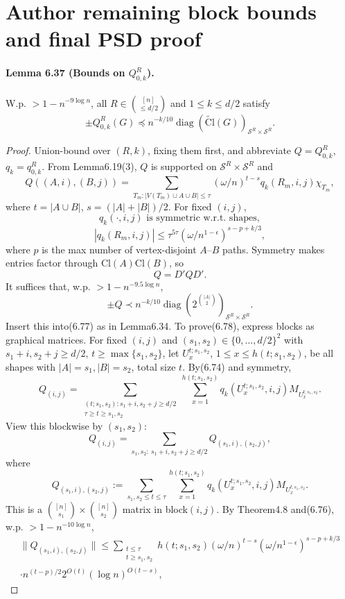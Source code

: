\section*{Author remaining block bounds and final PSD proof}
\paragraph{Lemma 6.37 (Bounds on $Q_{0,k}^R$).} W.p. $>1-n^{-9\log n}$, all $R\in\binom{[n]}{\le d/2}$ and $1\le k\le d/2$ satisfy
\[\pm Q_{0,k}^R(G)\preceq n^{-k/10}\operatorname{diag}(\widetilde{\mathrm{Cl}}(G))_{\mathcal S^R\times\mathcal S^R}.\]
\begin{proof}Union-bound over $(R,k)$, fixing them first, and abbreviate $Q=Q_{0,k}^R$, $q_k=q_{0,k}^R$. From Lemma6.19(3), $Q$ is supported on $\mathcal S^R\times\mathcal S^R$ and
\[Q((A,i),(B,j))=\sum_{T_m:|V(T_m)\cup A\cup B|\le\tau}(\omega/n)^{t-s}q_k(R_m,i,j)\chi_{T_m},\tag{6.74}\]
where $t=|A\cup B|$, $s=(|A|+|B|)/2$. For fixed $(i,j)$,
\[q_k(\cdot,i,j)\text{ is symmetric w.r.t. shapes},\tag{6.75}\]
\[|q_k(R_m,i,j)|\le\tau^{5\tau}(\omega/n^{1-\epsilon})^{s-p+k/3},\tag{6.76}\]
where $p$ is the max number of vertex-disjoint $A$--$B$ paths. Symmetry makes entries factor through $\mathrm{Cl}(A)\mathrm{Cl}(B)$, so
\[Q=D'QD'.\tag{6.77}\]
It suffices that, w.p. $>1-n^{-9.5\log n}$,
\[\pm Q\prec n^{-k/10}\operatorname{diag}(2^{\binom{|A|}2})_{\mathcal S^R\times\mathcal S^R}.\tag{6.78}\]
Insert this into(6.77) as in Lemma6.34. To prove(6.78), express blocks as graphical matrices. For fixed $(i,j)$ and $(s_1,s_2)\in\{0,\ldots,d/2\}^2$ with $s_1+i,s_2+j\ge d/2$, $t\ge\max\{s_1,s_2\}$, let $U_x^{t;s_1,s_2}$, $1\le x\le h(t;s_1,s_2)$, be all shapes with $|A|=s_1,|B|=s_2$, total size $t$. By(6.74) and symmetry,
\[Q_{(i,j)}=\sum_{\substack{(t;s_1,s_2)\colon s_1+i,s_2+j\ge d/2\\\tau\ge t\ge s_1,s_2}}\sum_{x=1}^{h(t;s_1,s_2)}q_k(U_x^{t;s_1,s_2},i,j)M_{U_x^{t;s_1,s_2}}.\]
View this blockwise by $(s_1,s_2)$:
\[Q_{(i,j)}=\sum_{s_1,s_2:\ s_1+i,s_2+j\ge d/2}Q_{(s_1,i),(s_2,j)},\tag{6.79}\]
where
\[Q_{(s_1,i),(s_2,j)}:=\sum_{s_1,s_2\le t\le\tau}\sum_{x=1}^{h(t;s_1,s_2)}q_k(U_x^{t;s_1,s_2},i,j)M_{U_x^{t;s_1,s_2}}.\tag{6.80}\]
This is a $\binom{[n]}{s_1}\times\binom{[n]}{s_2}$ matrix in block$(i,j)$. By Theorem4.8 and(6.76), w.p. $>1-n^{-10\log n}$,
\begin{multline*}\|Q_{(s_1,i),(s_2,j)}\|\le\sum_{\substack{t\le\tau\\t\ge s_1,s_2}}h(t;s_1,s_2)(\omega/n)^{t-s}(\omega/n^{1-\epsilon})^{s-p+k/3}\\\cdot n^{(t-p)/2}2^{O(t)}(\log n)^{O(t-s)},\tag{6.81}\end{multline*}

\end{proof}
